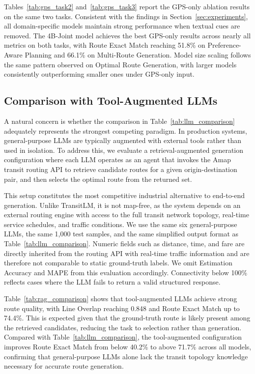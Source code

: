 \documentclass{llmxive}
\begin{document}
Tables~\ref{tab:gps_task2} and~\ref{tab:gps_task3} report the GPS-only ablation results on the same two tasks. Consistent with the findings in Section~\ref{sec:experiments}, all domain-specific models maintain strong performance when textual cues are removed. The 4B-Joint model achieves the best GPS-only results across nearly all metrics on both tasks, with Route Exact Match reaching 51.8\% on Preference-Aware Planning and 66.1\% on Multi-Route Generation. Model size scaling follows the same pattern observed on Optimal Route Generation, with larger models consistently outperforming smaller ones under GPS-only input.

\subsection{Comparison with Tool-Augmented LLMs}
\label{app:rag_comparison}

A natural concern is whether the comparison in Table~\ref{tab:llm_comparison} adequately represents the strongest competing paradigm. In production systems, general-purpose LLMs are typically augmented with external tools rather than used in isolation. To address this, we evaluate a retrieval-augmented generation configuration where each LLM operates as an agent that invokes the Amap transit routing API to retrieve candidate routes for a given origin-destination pair, and then selects the optimal route from the returned set.

This setup constitutes the most competitive industrial alternative to end-to-end generation. Unlike TransitLM, it is not map-free, as the system depends on an external routing engine with access to the full transit network topology, real-time service schedules, and traffic conditions. We use the same six general-purpose LLMs, the same 1{,}000 test samples, and the same simplified output format as Table~\ref{tab:llm_comparison}. Numeric fields such as distance, time, and fare are directly inherited from the routing API with real-time traffic information and are therefore not comparable to static ground-truth labels. We omit Estimation Accuracy and MAPE from this evaluation accordingly. Connectivity below 100\% reflects cases where the LLM fails to return a valid structured response.

Table~\ref{tab:rag_comparison} shows that tool-augmented LLMs achieve strong route quality, with Line Overlap reaching 0.848 and Route Exact Match up to 74.4\%. This is expected given that the ground-truth route is likely present among the retrieved candidates, reducing the task to selection rather than generation. Compared with Table~\ref{tab:llm_comparison}, the tool-augmented configuration improves Route Exact Match from below 40.2\% to above 71.7\% across all models, confirming that general-purpose LLMs alone lack the transit topology knowledge necessary for accurate route generation.
\end{document}
